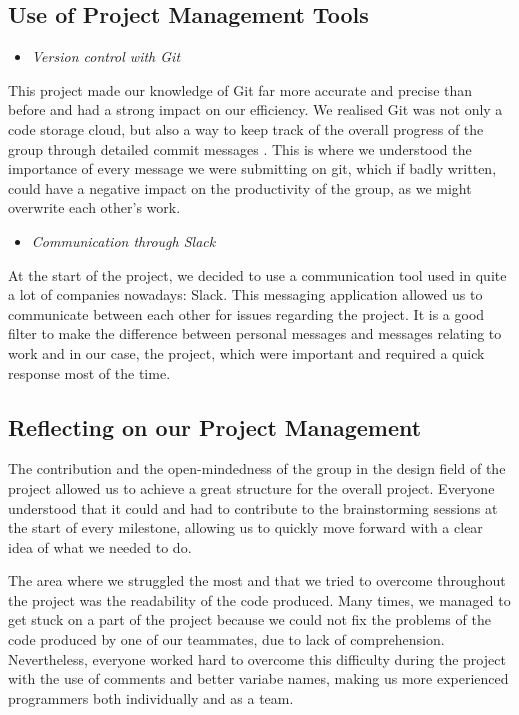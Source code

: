 \documentclass[a4wide, 11pt]{article}
\begin{document}
\subsection{Use of Project Management Tools}

\begin{itemize}
\item \textit{Version control with Git}
\end{itemize}

This project made our knowledge of Git far more accurate and precise than before and had a strong impact on our efficiency. We realised Git was not only a code storage cloud, but also a way to keep track of the overall progress of the group through detailed commit messages . This is where we understood the importance of every message we were submitting on git, which if badly written, could have a negative impact on the productivity of the group, as we might overwrite each other’s work.

\begin{itemize}
\item \textit{Communication through Slack}
\end{itemize}

At the start of the project, we decided to use a communication tool used in quite a lot of companies nowadays: Slack. This messaging application allowed us to communicate between each other for issues regarding the project. It is a good filter to make the difference between personal messages and messages relating to work and in our case, the project, which were important and required a quick response most of the time.


\subsection{Reflecting on our Project Management}

The contribution and the open-mindedness of the group in the design field of the project allowed us to achieve a great structure for the overall project. Everyone understood that it could and had to contribute to the brainstorming sessions at the start of every milestone, allowing us to quickly move forward with a clear idea of what we needed to do.

\bigskip

The area where we struggled the most and that we tried to overcome throughout the project was the readability of the code produced. Many times, we managed to get stuck on a part of the project because we could not fix the problems of the code produced by one of our teammates, due to lack of comprehension. Nevertheless, everyone worked hard to overcome this difficulty during the project with the use of comments and better variabe names, making us more experienced programmers both individually and as a team.
\end{document}
